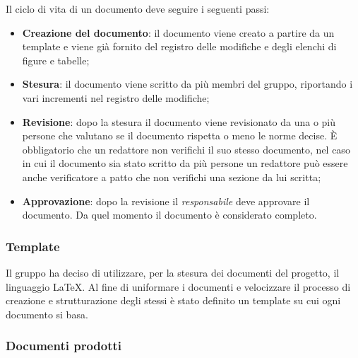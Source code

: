 Il ciclo di vita di un documento deve seguire i seguenti passi:
\begin{itemize}
    \item \textbf{Creazione del documento}: il documento viene creato a partire da un template e viene già fornito del registro delle modifiche e degli elenchi di figure e tabelle;
    \item \textbf{Stesura}: il documento viene scritto da più membri del gruppo, riportando i vari incrementi nel registro delle modifiche;
    \item \textbf{Revisione}: dopo la stesura il documento viene revisionato da una o più persone che valutano se il documento rispetta o meno le norme decise. È obbligatorio che un redattore non verifichi il suo stesso documento, nel caso in cui il documento sia stato scritto da più persone un redattore può essere anche verificatore a patto che non verifichi una sezione da lui scritta;
    \item \textbf{Approvazione}: dopo la revisione il \emph{responsabile} deve approvare il documento. Da quel momento il documento è considerato completo.
\end{itemize}

\subsubsection{Template}
\label{ssub:template}

Il gruppo ha deciso di utilizzare, per la stesura dei documenti del progetto, il linguaggio \LaTeX. Al fine di 
uniformare i documenti e velocizzare il processo di creazione e strutturazione degli stessi è stato definito un 
template su cui ogni documento si basa.

\subsubsection{Documenti prodotti}
\label{ssub:documenti_prodotti}

